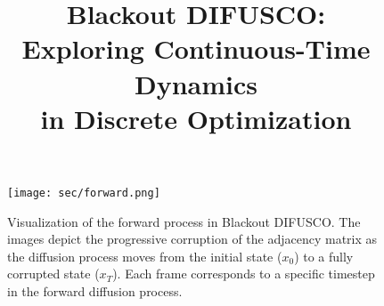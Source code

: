 \documentclass[10pt,twocolumn,letterpaper, capitalize]{article}
\title{
    Blackout DIFUSCO:\\
    Exploring Continuous-Time Dynamics\\
    in Discrete Optimization}
\begin{document}
\maketitle
\begin{figure*}[t] %
    \centering
    \texttt{[image: sec/forward.png]}
    \caption{Visualization of the forward process in Blackout DIFUSCO. The images depict the progressive corruption of the adjacency matrix as the diffusion process moves from the initial state (\(x_0\)) to a fully corrupted state (\(x_T\)). Each frame corresponds to a specific timestep in the forward diffusion process.}
    \label{fig:forward_process}
\end{figure*}









\end{document}
